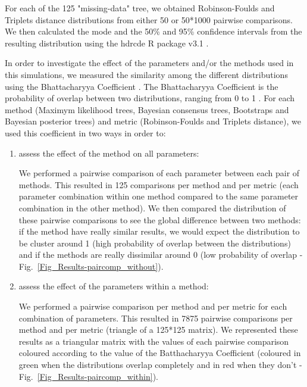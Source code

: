 \documentclass[12pt,letterpaper]{article}
\begin{document}
For each of the 125 "missing-data" tree, we obtained Robinson-Foulds and Triplets distance distributions from either 50 or 50*1000 pairwise comparisons. We then calculated the mode and the 50\% and 95\% confidence intervals from the resulting distribution using the hdrcde R package v3.1 \citep{hdrcde}. %

In order to investigate the effect of the parameters and/or the methods used in this simulations, we measured the similarity among the different distributions using the Bhattacharyya Coefficient \citep{Bhattacharyya}. The Bhattacharyya Coefficient is the probability of overlap between two distributions, ranging from 0 to 1 \citep{Bhattacharyya}. For each method (Maximym likelihood trees, Bayesian consensus trees, Bootstraps and Bayesian posterior trees) and metric (Robinson-Foulds and Triplets distance), we used this coefficient in two ways in order to:
\begin{enumerate}
\item assess the effect of the method on all parameters:

We performed a pairwise comparison of each parameter between each pair of methods. This resulted in 125 comparisons per method and per metric (each parameter combination within one method compared to the same parameter combination in the other method). We then compared the distribution of these pairwise comparisons to see the global difference between two methods: if the method have really similar results, we would expect the distribution to be cluster around 1 (high probability of overlap between the distributions) and if the methods are really dissimilar around 0 (low probability of overlap - Fig.~\ref{Fig_Results-paircomp_without}).
\item assess the effect of the parameters within a method:

We performed a pairwise comparison per method and per metric for each combination of parameters. This resulted in 7875 pairwise comparisons per method and per metric (triangle of a 125*125 matrix). We represented these results as a triangular matrix with the values of each pairwise comparison coloured according to the value of the Batthacharyya Coefficient (coloured in green when the distributions overlap completely and in red when they don't - Fig.~\ref{Fig_Results-paircomp_within}).
\end{enumerate}
\end{document}
